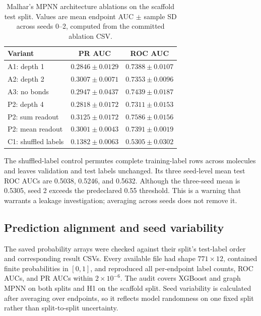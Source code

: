 \begin{table}[t]
\centering
\caption{Malhar's MPNN architecture ablations on the scaffold test split. Values are mean endpoint AUC $\pm$ sample SD across seeds 0--2, computed from the committed ablation CSV.}
\label{tab:member5-ablation}
\small
\begin{tabular}{lcc}
\toprule
Variant & PR AUC & ROC AUC \\
\midrule
A1: depth 1 & $0.2846 \pm 0.0129$ & $0.7388 \pm 0.0107$ \\
A2: depth 2 & $0.3007 \pm 0.0071$ & $0.7353 \pm 0.0096$ \\
A3: no bonds & $0.2947 \pm 0.0437$ & $0.7439 \pm 0.0187$ \\
P2: depth 4 & $0.2818 \pm 0.0172$ & $0.7311 \pm 0.0153$ \\
P2: sum readout & $0.3125 \pm 0.0172$ & $0.7586 \pm 0.0156$ \\
P2: mean readout & $0.3001 \pm 0.0043$ & $0.7391 \pm 0.0019$ \\
C1: shuffled labels & $0.1382 \pm 0.0063$ & $0.5305 \pm 0.0302$ \\
\bottomrule
\end{tabular}
\end{table}

The shuffled-label control permutes complete training-label rows across molecules and leaves validation and test labels unchanged. Its three seed-level mean test ROC AUCs are 0.5038, 0.5246, and 0.5632. Although the three-seed mean is 0.5305, seed 2 exceeds the predeclared 0.55 threshold. This is a warning that warrants a leakage investigation; averaging across seeds does not remove it.

\subsection{Prediction alignment and seed variability}
The saved probability arrays were checked against their split's test-label order and corresponding result CSVs. Every available file had shape $771\times12$, contained finite probabilities in $[0,1]$, and reproduced all per-endpoint label counts, ROC AUCs, and PR AUCs within $2\times10^{-6}$. The audit covers XGBoost and graph MPNN on both splits and H1 on the scaffold split. Seed variability is calculated after averaging over endpoints, so it reflects model randomness on one fixed split rather than split-to-split uncertainty.


